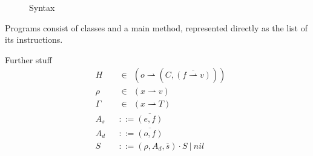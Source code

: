 
\begin{figure}[h]
    
    \caption{Syntax}
\end{figure}

Programs consist of classes and a main method, represented directly as the list of its instructions.


Further stuff
\begin{align*}
	 & H      &  & \in~~ (o \rightharpoonup (C,\overline{(f \rightharpoonup v)})) \\
	 & \rho   &  & \in~~ (x \rightharpoonup v)                                    \\
	 & \Gamma &  & \in~~ (x \rightharpoonup T)                                    \\
	 & A_s    &  & ::= \overline{(e, f)}                                          \\
	 & A_d    &  & ::= \overline{(o, f)}                                          \\
	 & S      &  & ::= (\rho, A_d, \overline{s}) \cdot S ~|~ nil
\end{align*}